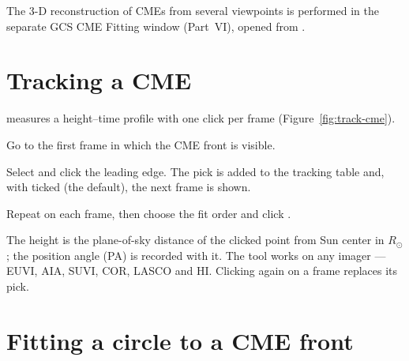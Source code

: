 The 3-D reconstruction of CMEs from several viewpoints is performed in the separate GCS CME
Fitting window (Part~VI), opened from .

\section{Tracking a CME}
\label{sec:track-cme}

 measures a height--time profile with one click per frame
(Figure~\ref{fig:track-cme}).
\begin{steps}
  \item Go to the first frame in which the CME front is visible.
  \item Select  and click the leading edge. The pick is added to the tracking
    table and, with  ticked (the default), the next
    frame is shown.
  \item Repeat on each frame, then choose the fit order and click .
\end{steps}
The height is the plane-of-sky distance of the clicked point from Sun center in \(R_\odot\);
the position angle (PA) is recorded with it. The tool works on any imager --- EUVI, AIA,
SUVI, COR, LASCO and HI. Clicking again on a frame replaces its pick.


\section{Fitting a circle to a CME front}
\label{sec:circle-fit}

